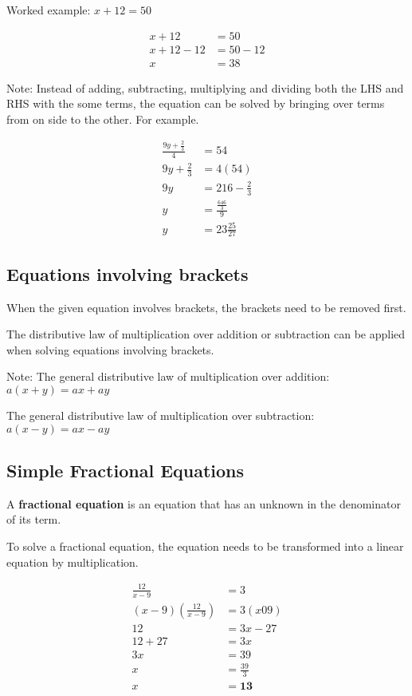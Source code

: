 \documentclass[../main]{subfiles}
\begin{document}
Worked example:
\(x + 12 = 50\)

\begin{align*} 
  x + 12 &=  50 \\
  x + 12 -12 &=  50 -12 \\
  x &= 38
\end{align*}

Note: Instead of adding, subtracting, multiplying and dividing both the LHS and
RHS with the some terms, the equation can be solved by bringing over terms from
on side to the other. For example.

\begin{align*}
  \frac {9y + {\frac 2 3}} 4 &= 54 \\
  9y + {\frac 2 3} &= 4(54)  \\
  9y &= 216 - {\frac 2 3 }    \\
  y &= {\frac {\frac {646} 3} 9}  \\
  y &= 23 { \frac {25} {27}}
\end{align*}
\subsection{Equations involving brackets}
When the given equation involves brackets, the brackets need to be removed
first.

The distributive law of multiplication over addition or subtraction can be
applied when solving equations involving brackets.

Note:
The general distributive law of multiplication over addition:
\(a(x +y ) = ax + ay\) 


The general distributive law of multiplication over subtraction:
\(a(x -y ) = ax - ay\) 

\subsection{Simple Fractional Equations}
A \textbf{fractional equation} is an equation that has an unknown in the
denominator of its term.


To solve a fractional equation, the equation needs to be transformed into a
linear equation by multiplication.

\begin{align*}
  {\frac{12}{x -9}} &= 3 \\
  (x-9)(\frac {12} {x -9}) &= 3 (x 09) \\
  12 &= 3x -27 \\
  12 + 27 & = 3x \\
  3x &= 39 \\
  x &= {\frac {39} 3} \\
  x &= \mathbf{13}
\end{align*}
\end{document}

